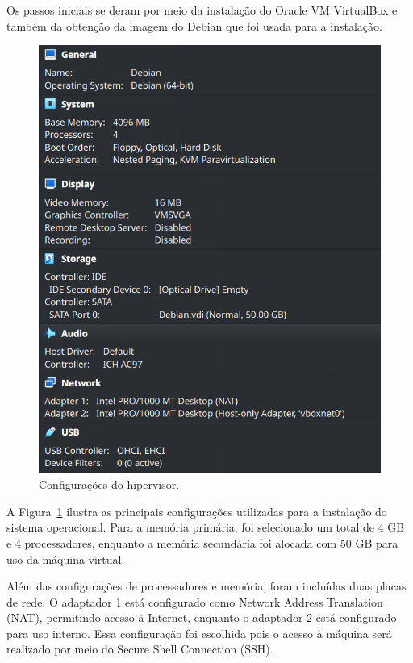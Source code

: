 \documentclass[
	12pt,				%
	oneside,   	        %
	a4paper,			%
	english,			%
	french,				%
	spanish,			%
	brazil,				%
	]{pacotes/abntex2}
\begin{document}
Os passos iniciais se deram por meio da instalação do Oracle VM VirtualBox e também da obtenção da imagem do Debian que foi usada para a instalação. 

\begin{figure}[H]
  \centering
  \includegraphics[scale=0.7]{figuras/vm.png}
  \caption{Configurações do hipervisor.}
  \label{fig:vm}
\end{figure}

A Figura~\ref{fig:vm} ilustra as principais configurações utilizadas para a instalação do sistema operacional. Para a memória primária, foi selecionado um total de 4 GB e 4 processadores, enquanto a memória secundária foi alocada com 50 GB para uso da máquina virtual.

Além das configurações de processadores e memória, foram incluídas duas placas de rede. O adaptador 1 está configurado como Network Address Translation (NAT), permitindo acesso à Internet, enquanto o adaptador 2 está configurado para uso interno. Essa configuração foi escolhida pois o acesso à máquina será realizado por meio do Secure Shell Connection (SSH).
\end{document}
